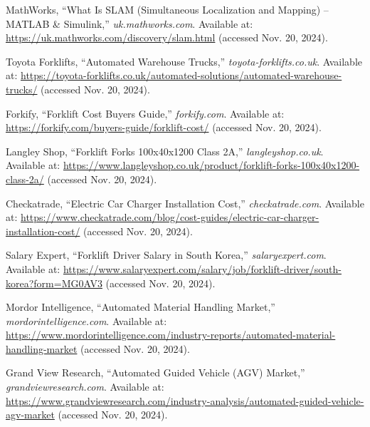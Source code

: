 \documentclass[12pt]{article}
\begin{document}
\begin{thebibliography}{99}

MathWorks, “What Is SLAM (Simultaneous Localization and Mapping) – MATLAB \& Simulink,” \textit{uk.mathworks.com}.  
Available at: \url{https://uk.mathworks.com/discovery/slam.html} (accessed Nov. 20, 2024).
 

Toyota Forklifts, “Automated Warehouse Trucks,” \textit{toyota-forklifts.co.uk}.  
Available at: \url{https://toyota-forklifts.co.uk/automated-solutions/automated-warehouse-trucks/} (accessed Nov. 20, 2024).

Forkify, “Forklift Cost Buyers Guide,” \textit{forkify.com}.  
Available at: \url{https://forkify.com/buyers-guide/forklift-cost/} (accessed Nov. 20, 2024).

Langley Shop, “Forklift Forks 100x40x1200 Class 2A,” \textit{langleyshop.co.uk}.  
Available at: \url{https://www.langleyshop.co.uk/product/forklift-forks-100x40x1200-class-2a/} (accessed Nov. 20, 2024).

Checkatrade, “Electric Car Charger Installation Cost,” \textit{checkatrade.com}.  
Available at: \url{https://www.checkatrade.com/blog/cost-guides/electric-car-charger-installation-cost/} (accessed Nov. 20, 2024).

Salary Expert, “Forklift Driver Salary in South Korea,” \textit{salaryexpert.com}.  
Available at: \url{https://www.salaryexpert.com/salary/job/forklift-driver/south-korea?form=MG0AV3} (accessed Nov. 20, 2024).

Mordor Intelligence, “Automated Material Handling Market,” \textit{mordorintelligence.com}.  
Available at: \url{https://www.mordorintelligence.com/industry-reports/automated-material-handling-market} (accessed Nov. 20, 2024).

Grand View Research, “Automated Guided Vehicle (AGV) Market,” \textit{grandviewresearch.com}.  
Available at: \url{https://www.grandviewresearch.com/industry-analysis/automated-guided-vehicle-agv-market} (accessed Nov. 20, 2024).

\end{thebibliography}


 

\end{document}
